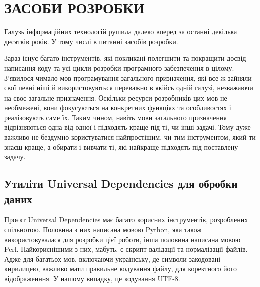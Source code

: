 \section{ЗАСОБИ РОЗРОБКИ}
Галузь інформаційних технологій рушила далеко вперед за останні декілька десятків років.
У тому числі в питанні засобів розробки. 

Зараз існує багато інструментів, які покликані
полегшити та покращити досвід написання коду та усі цикли розробки програмного забезпечення
в цілому. З'явилося чимало мов програмування загального призначення,
які все ж зайняли свої певні ніші й використовуються переважно в якійсь одній галузі,
незважаючи на своє загальне призначення. Оскільки ресурси розробників цих мов не необмежені,
вони фокусуються на конкретних функціях та особливостях і реалізовують саме їх. Таким чином,
навіть мови загального призначення відрізняються одна від одної і підходять краще під ті,
чи інші задачі. Тому дуже важливо не бездумно користуватися найпростішим, чи тим інструментом,
який ти знаєш краще, а обирати і вивчати ті, які найкраще підходять під поставлену задачу.

\subsection{Утиліти Universal Dependencies для обробки даних}

Проєкт Universal Dependencies має багато корисних інструментів, розроблених спільнотою.
Половина з них написана мовою Python, яка також використовувалася для розробки
цієї роботи, інша половина написана мовою Perl.
Найкориснішими з них, мабуть, є скрипт валідації та нормалізації
файлів. Адже для багатьох мов, включаючи українську, де символи закодовані
кирилицею, важливо мати правильне кодування файлу, для коректного його
відображенння. У нашому випадку, це кодування UTF-8.

